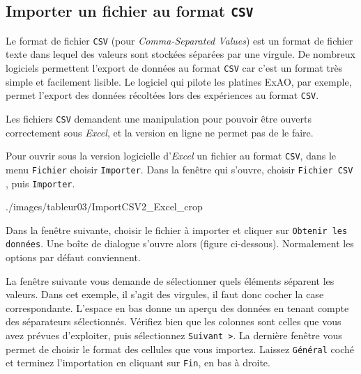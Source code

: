 

\subsection{Importer un fichier au format \texttt{CSV}}\label{Calc3fichierCSV}

Le format de fichier \texttt{CSV} (pour \emph{Comma-Separated Values}) est un format de fichier texte dans lequel des valeurs sont stockées séparées par une virgule. De nombreux logiciels permettent l'export de données au format \texttt{CSV} car c'est un format très simple et facilement lisible. Le logiciel qui pilote les platines ExAO, par exemple, permet l'export des données récoltées lors des expériences au format \texttt{CSV}.

Les fichiers \texttt{CSV} demandent une manipulation pour pouvoir être ouverts correctement sous \emph{Excel}, et la version en ligne ne permet pas de le faire.

\vspace{1em}

Pour ouvrir sous la version logicielle d'\emph{Excel} un fichier au format \texttt{CSV}, dans le menu \texttt{Fichier}  choisir \texttt{Importer}.  Dans la fenêtre qui s'ouvre, choisir \texttt{Fichier CSV} , puis \texttt{Importer}. 

%
{./images/tableur03/ImportCSV2_Excel_crop}{\textwidth}

Dans la fenêtre suivante, choisir le fichier à importer et cliquer sur \texttt{Obtenir les données}. Une boîte de dialogue s'ouvre alors (figure ci-dessous). Normalement les options par défaut conviennent. 


La fenêtre suivante vous demande de sélectionner quels éléments séparent les valeurs.  Dans cet exemple, il s'agit des virgules, il faut donc cocher la case correspondante. L'espace en bas donne un aperçu des données en tenant compte des séparateurs sélectionnés.  Vérifiez bien que les colonnes sont celles que vous avez prévues d'exploiter, puis sélectionnez \texttt{Suivant >}. La dernière fenêtre vous permet de choisir le format des cellules que vous importez. Laissez \texttt{Général} coché et terminez l'importation en cliquant sur \texttt{Fin}, en bas à droite.

